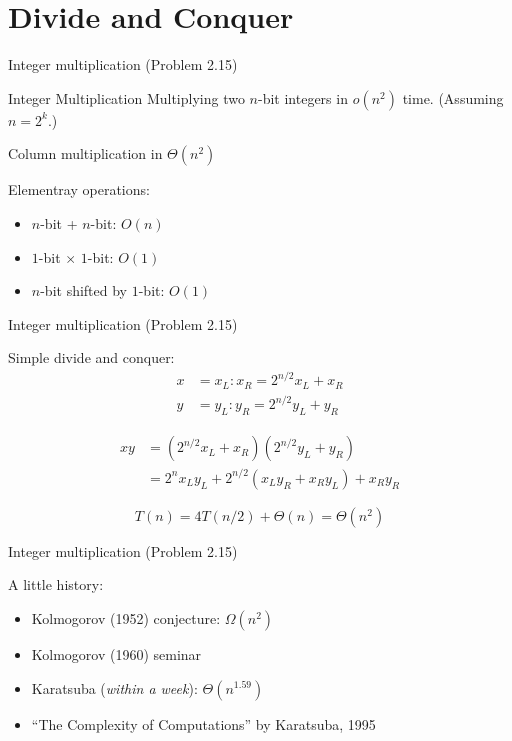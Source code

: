\section{Divide and Conquer}

\begin{frame}{Integer multiplication (Problem 2.15)}
  \begin{exampleblock}{Integer Multiplication}
    Multiplying two $n$-bit integers in $o(n^2)$ time. {\small (Assuming $n = 2^k$.)}
  \end{exampleblock}

  \vspace{0.50cm}

  \centerline{Column multiplication in $\Theta(n^2)$}

  \begin{block}{Elementray operations:}
	\begin{itemize}
	  \item $n$-bit + $n$-bit: $O(n)$
	  \item $1$-bit $\times$ $1$-bit: $O(1)$
	  \item $n$-bit shifted by $1$-bit: $O(1)$
	\end{itemize}
  \end{block}
\end{frame}
\begin{frame}{Integer multiplication (Problem 2.15)}
  \begin{block}{Simple divide and conquer:}
	\begin{align*}
	  x & = x_L : x_R = 2^{n/2} x_L + x_R  \\
	  y & = y_L : y_R = 2^{n/2} y_L + y_R
	\end{align*}

	\begin{align*}
	  xy & = (2^{n/2} x_L + x_R) (2^{n/2} y_L + y_R) \\
		 & = 2^{n} x_L y_L + 2^{n/2} (x_L y_R + x_R y_L) + x_R y_R
	\end{align*}

	\[
	  T(n) = 4T(n/2) + \Theta(n) = \Theta(n^2)
	\]
  \end{block}
\end{frame}
\begin{frame}{Integer multiplication (Problem 2.15)}
  \begin{block}{A little history:}
  \begin{itemize}
    \item Kolmogorov (1952) conjecture: $\Omega(n^2)$
    \item Kolmogorov (1960) seminar
    \item Karatsuba (\emph{within a week}): $\Theta(n^{1.59})$
    \item ``The Complexity of Computations'' by Karatsuba, 1995
  \end{itemize}
  \end{block}
\end{frame}
